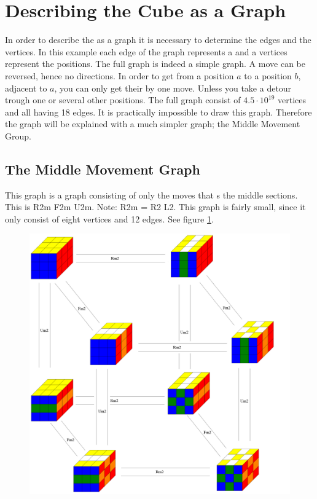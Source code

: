 
\section{Describing the Cube as a Graph}
In order to describe the \rubik{} as a graph it is necessary to determine the edges and the vertices. In this example each edge of the graph represents a \twist{} and a vertices represent the positions.  The full \rubik{} graph is indeed a simple graph. A move can be reversed, hence no directions. In order to get from a position $a$ to a position $b$, adjacent to $a$, you can only get their by one move. Unless you take a detour trough one or several other positions. The full \rubik{} graph consist of $4.5\cdot10^{19}$ vertices and all having 18 edges. It is practically impossible to draw this graph. Therefore the graph will be explained with a much simpler graph; the Middle Movement Group.


\subsection{The Middle Movement Graph}
\label{sub:middleMoveGroup}
This graph is a \rubik{} graph consisting of only the moves that \twist{}s the middle sections. This is R2m F2m U2m. Note: R2m = R2 L2.  This graph is fairly small, since it only consist of eight vertices and 12 edges. See figure \ref{fig:graphMiddleSlice2}.

\begin{figure}
	\centering
		\includegraphics[width = \textwidth]{input/pics/graphMiddleSlice2.PNG}
	\caption{}
	\label{fig:graphMiddleSlice2}
\end{figure}

